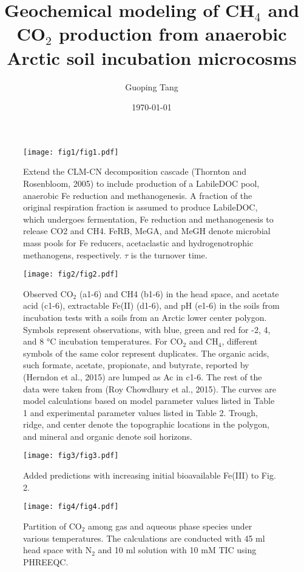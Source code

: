 \documentclass[12pt, a4paper]{article}
\title{Geochemical modeling of CH$_4$ and CO$_2$ production from anaerobic Arctic soil incubation microcosms}
\author{Guoping Tang}
\date\today{}
\begin{document}
\maketitle

\begin{abstract}
\end{abstract}

\begin{figure}
\centering
\texttt{[image: fig1/fig1.pdf]}
\caption{Extend the CLM-CN decomposition cascade (Thornton and Rosenbloom,
2005) to include production of a LabileDOC pool, anaerobic Fe reduction and
methanogenesis. A fraction of the original respiration fraction is assumed to
produce LabileDOC, which undergoes fermentation, Fe reduction and
methanogenesis to release CO2 and CH4. FeRB, MeGA, and MeGH denote microbial
mass pools for Fe reducers, acetaclastic and hydrogenotrophic methanogens,
respectively. $\tau$ is the turnover time.}
\label{fig1}
\end{figure}

\begin{figure}
\centering
\texttt{[image: fig2/fig2.pdf]}
\caption{
Observed CO$_2$ (a1-6) and CH4 (b1-6) in the head space, and acetate acid (c1-6),
extractable Fe(II) (d1-6), and pH (e1-6) in the soils from incubation tests
with a soils from an Arctic  lower center polygon. Symbols represent
observations, with blue, green and red for -2, 4, and 8 °C incubation
temperatures. For CO$_2$ and CH$_4$, different symbols of the same color represent
duplicates. The organic acids, such formate, acetate, propionate, and butyrate,
reported by (Herndon et al., 2015)  are lumped as Ac in c1-6. The rest of the
data were taken from (Roy Chowdhury et al., 2015). The curves are model
calculations based on model parameter values listed in Table 1 and experimental
parameter values listed in Table 2. Trough, ridge, and center denote the
topographic locations in the polygon, and mineral and organic denote soil
horizons.}
\label{fig2}
\end{figure}

\begin{figure}
\centering
\texttt{[image: fig3/fig3.pdf]}
\caption{
Added predictions with increasing initial bioavailable Fe(III) to Fig. 2.
}
\label{fig3}
\end{figure}

\begin{figure}
\centering
\texttt{[image: fig4/fig4.pdf]}
\caption{
Partition of CO$_2$ among gas and aqueous phase species under various
temperatures. The calculations are conducted with 45 ml head space with N$_2$ and
10 ml solution with 10 mM TIC using PHREEQC. 
}
\label{fig4}
\end{figure}
\end{document}

